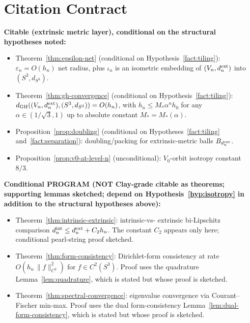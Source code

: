 \documentclass[11pt, a4paper]{amsart}
\theoremstyle{definition}
\newcommand{\dGH}{d_{\mathrm{GH}}}
\newcommand{\dsph}{d_{S^3}}
\begin{document}
\section{Citation Contract}
\label{sec:handoff}

\textbf{Citable (extrinsic metric layer), conditional on the
structural hypotheses noted:}
\begin{itemize}
\item Theorem~\ref{thm:epsilon-net} (conditional on
  Hypothesis~\ref{fact:tiling}): $\varepsilon_n = O(h_n)$ net
  radius, plus $\iota_n$ is an isometric embedding of
  $(V_n, d_n^{\rm ext})$ into $(S^3, \dsph)$.
\item Theorem~\ref{thm:gh-convergence} (conditional on
  Hypothesis~\ref{fact:tiling}): $\dGH((V_n, d_n^{\rm
  ext}), (S^3, \dsph)) = O(h_n)$, with $h_n \leq M_\ast \alpha^n
  h_0$ for any $\alpha \in (1/\sqrt{3}, 1)$ up to absolute
  constant $M_\ast = M_\ast(\alpha)$.
\item Proposition~\ref{prop:doubling} (conditional on
  Hypotheses~\ref{fact:tiling} and~\ref{fact:separation}):
  doubling/packing for extrinsic-metric balls
  $B_{d_n^{\rm ext}}$.
\item Proposition~\ref{prop:v0-at-level-n} (unconditional):
  $V_0$-orbit isotropy constant $8/3$.
\end{itemize}

\textbf{Conditional PROGRAM (NOT Clay-grade citable as theorems;
supporting lemmas sketched; depend on Hypothesis~\ref{hyp:isotropy}
in addition to the structural hypotheses above):}
\begin{itemize}
\item Theorem~\ref{thm:intrinsic-extrinsic}: intrinsic-vs-
  extrinsic bi-Lipschitz comparison $d_n^{\rm int} \leq
  d_n^{\rm ext} + C_2 h_n$. The constant $C_2$ appears only
  here; conditional pearl-string proof sketched.
\item Theorem~\ref{thm:form-consistency}: Dirichlet-form
  consistency at rate $O(h_n\,\|f\|_{C^2}^2)$ for $f \in C^2(S^3)$.
  Proof uses the quadrature Lemma~\ref{lem:quadrature}, which is
  stated but whose proof is sketched.
\item Theorem~\ref{thm:spectral-convergence}: eigenvalue
  convergence via Courant--Fischer min-max. Proof uses the dual
  form-consistency Lemma~\ref{lem:dual-form-consistency}, which
  is stated but whose proof is sketched.
\end{itemize}
\end{document}
